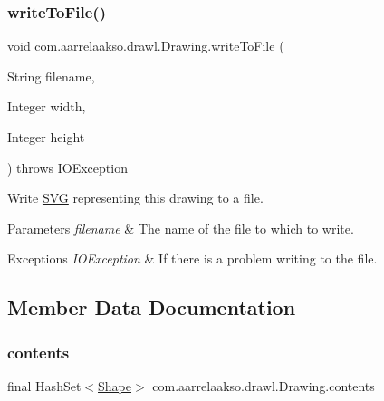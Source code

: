 \subsubsection{\texorpdfstring{write\+To\+File()}{writeToFile()}}
{\footnotesize\ttfamily void com.\+aarrelaakso.\+drawl.\+Drawing.\+write\+To\+File (\begin{DoxyParamCaption}\item[{String}]{filename,  }\item[{Integer}]{width,  }\item[{Integer}]{height }\end{DoxyParamCaption}) throws I\+O\+Exception}



Write \hyperlink{classcom_1_1aarrelaakso_1_1drawl_1_1_s_v_g}{S\+VG} representing this drawing to a file. 


\begin{DoxyParams}{Parameters}
{\em filename} & The name of the file to which to write. \\
\hline
\end{DoxyParams}

\begin{DoxyExceptions}{Exceptions}
{\em I\+O\+Exception} & If there is a problem writing to the file. \\
\hline
\end{DoxyExceptions}


\subsection{Member Data Documentation}
\mbox{\label{classcom_1_1aarrelaakso_1_1drawl_1_1_drawing_ab9ec6030e9f21d42852b308c482b3ccf}} 
\subsubsection{\texorpdfstring{contents}{contents}}
{\footnotesize\ttfamily final Hash\+Set$<$\hyperlink{classcom_1_1aarrelaakso_1_1drawl_1_1_shape}{Shape}$>$ com.\+aarrelaakso.\+drawl.\+Drawing.\+contents\hspace{0.3cm}{\ttfamily [private]}}

\mbox{\label{classcom_1_1aarrelaakso_1_1drawl_1_1_drawing_a4a0d4d3e176d56acbdae698a827271fc}} 
